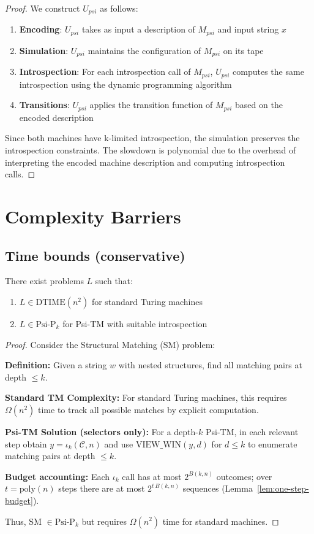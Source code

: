 \begin{proof}
We construct $U_{psi}$ as follows:

\begin{enumerate}
\item \textbf{Encoding}: $U_{psi}$ takes as input a description of $M_{psi}$ and input string $x$
\item \textbf{Simulation}: $U_{psi}$ maintains the configuration of $M_{psi}$ on its tape
\item \textbf{Introspection}: For each introspection call of $M_{psi}$, $U_{psi}$ computes the same introspection using the dynamic programming algorithm
\item \textbf{Transitions}: $U_{psi}$ applies the transition function of $M_{psi}$ based on the encoded description
\end{enumerate}

Since both machines have k-limited introspection, the simulation preserves the introspection constraints. The slowdown is polynomial due to the overhead of interpreting the encoded machine description and computing introspection calls.
\end{proof}

\section{Complexity Barriers}

\subsection{Time bounds (conservative)}

\begin{theorem}
There exist problems $L$ such that:
\begin{enumerate}
\item $L \in \text{DTIME}(n^2)$ for standard Turing machines
\item $L \in \text{Psi-P}_k$ for Psi-TM with suitable introspection
\end{enumerate}
\end{theorem}

\begin{proof}
Consider the Structural Matching (SM) problem:

\textbf{Definition:} Given a string $w$ with nested structures, find all matching pairs at depth $\leq k$.

\textbf{Standard TM Complexity:}
For standard Turing machines, this requires $\Omega(n^2)$ time to track all possible matches by explicit computation.

\textbf{Psi-TM Solution (selectors only):}
For a depth-$k$ Psi-TM, in each relevant step obtain $y=\iota_k(\mathcal{C},n)$ and use $\mathrm{VIEW\_WIN}(y,d)$ for $d\le k$ to enumerate matching pairs at depth $\le k$.

\textbf{Budget accounting:}
Each $\iota_k$ call has at most $2^{B(k,n)}$ outcomes; over $t=\mathrm{poly}(n)$ steps there are at most $2^{t\,B(k,n)}$ sequences (Lemma~\ref{lem:one-step-budget}).

Thus, SM $\in \text{Psi-P}_k$ but requires $\Omega(n^2)$ time for standard machines.
\end{proof}


